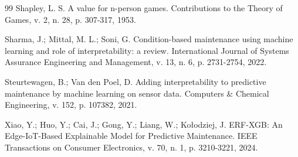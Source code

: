 \documentclass[12pt,a4paper]{article}
\begin{document}
\begin{thebibliography}{99}
 Shapley, L. S. A value for n-person games. Contributions to the Theory of Games, v. 2, n. 28, p. 307-317, 1953.

 Sharma, J.; Mittal, M. L.; Soni, G. Condition-based maintenance using machine learning and role of interpretability: a review. International Journal of Systems Assurance Engineering and Management, v. 13, n. 6, p. 2731-2754, 2022.

 Steurtewagen, B.; Van den Poel, D. Adding interpretability to predictive maintenance by machine learning on sensor data. Computers \& Chemical Engineering, v. 152, p. 107382, 2021.

 Xiao, Y.; Huo, Y.; Cai, J.; Gong, Y.; Liang, W.; Kołodziej, J. ERF-XGB: An Edge-IoT-Based Explainable Model for Predictive Maintenance. IEEE Transactions on Consumer Electronics, v. 70, n. 1, p. 3210-3221, 2024.

\end{thebibliography}
\end{document}
